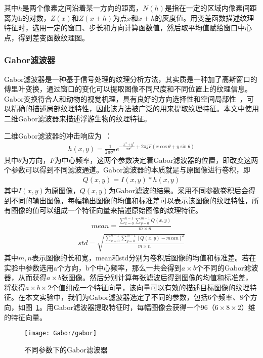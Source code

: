 其中$h$是两个像素之间沿着某一方向的距离，$N(h)$是指在一定的区域内像素间距离为h的对数，$Z(x)$和$Z(x+h)$为点$x$和$x+h$的灰度值。用变差函数描述纹理特征时，选用一定的窗口、步长和方向计算函数值，然后取平均值赋给窗口中心点，得到差变函数纹理图。

\subsubsection{Gabor滤波器}
\label{sec:multifig}

Gabor滤波器是一种基于信号处理的纹理分析方法，其实质是一种加了高斯窗口的傅里叶变换，通过窗口的变化可以提取图像不同尺度和不同位置上的纹理信息。Gabor变换符合人和动物的视觉机理，具有良好的方向选择性和空间局部性~\cite{高梓瑞2012gabor}，可以精确的描述局部纹理特性，因此该方法被广泛的用来提取纹理特征。本文中使用二维Gabor滤波器来描述浮游生物的纹理特征。

二维Gabor滤波器的冲击响应为~\cite{王铌2006海洋浮游生物数字图像处理方法}：
\begin{eqnarray}
h(x,y) = \frac{1}{2\pi \sigma^{2}} e^{-\frac{x^{2}+y^{2}}{2\sigma^{2}}+2\pi jF(x\cos\theta+y\sin\theta)}
\end{eqnarray}
其中$\theta$为方向，$F$为中心频率，这两个参数决定着Gabor滤波器的位置，即改变这两个参数可以得到不同滤波通道。Gabor滤波器的本质就是与原图像进行卷积，即
\begin{eqnarray}
Q(x,y)=I(x,y)*h(x,y)
\end{eqnarray}
其中$I(x,y)$为原图像，$Q(x,y)$为Gabor滤波的结果。采用不同参数卷积后会得到不同的输出图像，每幅输出图像的均值和标准差可以表示该图像的纹理特性，所有图像的值可以组成一个特征向量来描述原始图像的纹理特征。
\begin{eqnarray}
mean = \frac{\sum^{n-1}_{x=0}\sum^{m-1}_{y=0}Q(x,y)}{m \times n}
\end{eqnarray}
\begin{eqnarray}
std=\sqrt{\frac{\sum^{n-1}_{x=0}\sum^{m-1}_{y=0}[Q(x,y)-mean]^{2}}{m \times n}}
\end{eqnarray}
其中$m, n$表示图像的长和宽，mean和std分别为卷积后图像的均值和标准差。若在实验中参数选用a个方向，b个中心频率，那么一共会得到$a \times b$个不同的Gabor滤波器，从而获得$a \times b$张图像。然后分别计算每张滤波后得到图像的均值和标准差，将获得$a \times b \times 2$个值组成一个特征向量，该向量可以有效的描述目标图像的纹理特征。在本文实验中，我们为Gabor滤波器选定了不同的参数，包括6个频率、8个方向，如图~\ref{fig:gabor}。用Gabor滤波器提取特征时，每幅图像会获得一个96（$6 \times 8 \times 2$）维的特征向量。
\begin{figure}[H] %
  \centering
  \texttt{[image: Gabor/gabor]}
  \caption{不同参数下的Gabor滤波器}
  \label{fig:gabor}
\end{figure}

